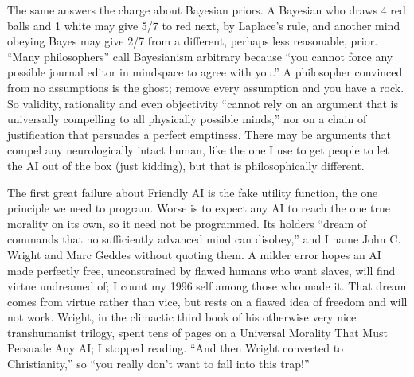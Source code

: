 The same answers the charge about Bayesian priors. A Bayesian who draws 4 red balls and 1 white may give 5/7 to red next, by Laplace's rule, and another mind obeying Bayes may give 2/7 from a different, perhaps less reasonable, prior. ``Many philosophers'' call Bayesianism arbitrary because ``you cannot force any possible journal editor in mindspace to agree with you.''  A philosopher convinced from no assumptions is the ghost; remove every assumption and you have a rock. So validity, rationality and even objectivity ``cannot rely on an argument that is universally compelling to all physically possible minds,'' nor on a chain of justification that persuades a perfect emptiness. There may be arguments that compel any neurologically intact human, like the one I use to get people to let the AI out of the box (just kidding), but that is philosophically different. 

The first great failure about Friendly AI is the fake utility function, the one principle we need to program. Worse is to expect any AI to reach the one true morality on its own, so it need not be programmed. Its holders ``dream of commands that no sufficiently advanced mind can disobey,'' and I name John C. Wright and Marc Geddes without quoting them. A milder error hopes an AI made perfectly free, unconstrained by flawed humans who want slaves, will find virtue undreamed of; I count my 1996 self among those who made it. That dream comes from virtue rather than vice, but rests on a flawed idea of freedom and will not work. Wright, in the climactic third book of his otherwise very nice transhumanist trilogy, spent tens of pages on a Universal Morality That Must Persuade Any AI; I stopped reading. ``And then Wright converted to Christianity,'' so ``you really don't want to fall into this trap!'' 
